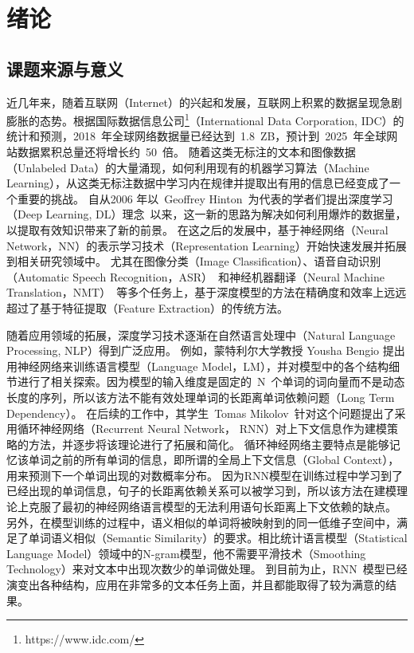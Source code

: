 \chapter{绪论}
\section{课题来源与意义}
近几年来，随着互联网（Internet）的兴起和发展，互联网上积累的数据呈现急剧膨胀的态势。根据国际数据信息公司\footnote{https://www.idc.com/}（International Data Corporation, IDC）的统计和预测，2018~年全球网络数据量已经达到~1.8~ZB，预计到~2025~年全球网站数据累积总量还将增长约~50~倍。
随着这类无标注的文本和图像数据（Unlabeled Data）的大量涌现，如何利用现有的机器学习算法（Machine Learning），从这类无标注数据中学习内在规律并提取出有用的信息已经变成了一个重要的挑战。
自从2006 年以~Geoffrey Hinton~为代表的学者们提出深度学习（Deep Learning, DL）理念~以来，这一新的思路为解决如何利用爆炸的数据量，以提取有效知识带来了新的前景。
在这之后的发展中，基于神经网络（Neural Network，NN）的表示学习技术（Representation Learning）开始快速发展并拓展到相关研究领域中。
尤其在图像分类（Image Classification）、语音自动识别（Automatic Speech Recognition，ASR）~和神经机器翻译（Neural Machine Translation，NMT）~等多个任务上，基于深度模型的方法在精确度和效率上远远超过了基于特征提取（Feature Extraction）的传统方法。

随着应用领域的拓展，深度学习技术逐渐在自然语言处理中（Natural Language Processing, NLP）得到广泛应用。 例如，蒙特利尔大学教授 Yousha Bengio 提出用神经网络来训练语言模型（Language Model，LM），并对模型中的各个结构细节进行了相关探索。因为模型的输入维度是固定的~N~个单词的词向量而不是动态长度的序列，所以该方法不能有效处理单词的长距离单词依赖问题（Long Term Dependency）。
在后续的工作中，其学生~Tomas Mikolov~针对这个问题提出了采用循环神经网络（Recurrent Neural Network， RNN）对上下文信息作为建模策略的方法，并逐步将该理论进行了拓展和简化。
循环神经网络主要特点是能够记忆该单词之前的所有单词的信息，即所谓的全局上下文信息（Global Context），用来预测下一个单词出现的对数概率分布。
因为RNN模型在训练过程中学习到了已经出现的单词信息，句子的长距离依赖关系可以被学习到，所以该方法在建模理论上克服了最初的神经网络语言模型的无法利用语句长距离上下文依赖的缺点。
另外，在模型训练的过程中，语义相似的单词将被映射到的同一低维子空间中，满足了单词语义相似（Semantic Similarity）的要求。相比统计语言模型（Statistical Language Model）领域中的N-gram模型，他不需要平滑技术（Smoothing Technology）来对文本中出现次数少的单词做处理。
到目前为止，RNN~模型已经演变出各种结构，应用在非常多的文本任务上面，并且都能取得了较为满意的结果。

